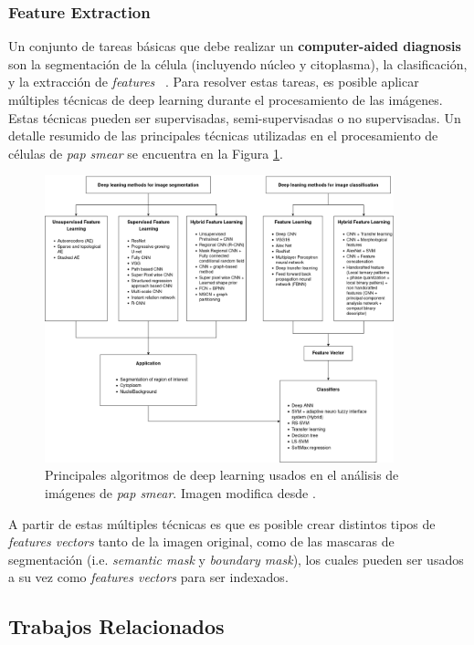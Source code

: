 \documentclass[10pt]{article}
\begin{document}
\subsubsection{Feature Extraction}
Un conjunto de tareas básicas que debe realizar un \textbf{computer-aided diagnosis} son la segmentación de la célula (incluyendo núcleo y citoplasma), la clasificación, y la extracción de \textit{features} ~\cite{Win2018}. Para resolver estas tareas, es posible aplicar múltiples técnicas de deep learning durante el procesamiento de las imágenes. Estas técnicas pueden ser supervisadas, semi-supervisadas o no supervisadas. Un detalle resumido de las principales técnicas utilizadas en el procesamiento de células de \textit{pap smear} se encuentra en la Figura \ref{fig:mt:2a}.
\begin{figure}
    \centering
    \includegraphics[width=0.9\textwidth]{img/dl-algo.png}
    \caption{Principales algoritmos de deep learning usados en el análisis de imágenes de \textit{pap smear}. Imagen modifica desde \cite{9046839}.}
    \label{fig:mt:2a}
\end{figure}
A partir de estas múltiples técnicas es que es posible crear distintos tipos de \textit{features vectors} tanto de la imagen original, como de las mascaras de segmentación (i.e. \textit{semantic mask} y \textit{boundary mask}), los cuales pueden ser usados a su vez como \textit{features vectors} para ser indexados. 

\subsection{Trabajos Relacionados}
\end{document}
